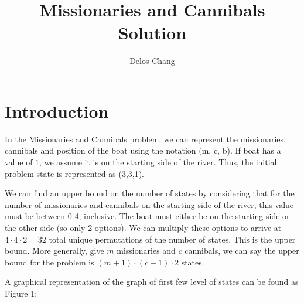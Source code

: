\documentclass[a4paper]{report}
\title{Missionaries and Cannibals Solution}
\author{Delos Chang}
\begin{document}
\maketitle

\section{Introduction}

In the Missionaries and Cannibals problem, we can represent the missionaries, cannibals and position of the boat 
using the notation (m, c, b). If boat has a value of $1$, we assume it is on the starting side of the river. Thus, 
the initial problem state is represented as (3,3,1). 

We can find an upper bound on the number of states by considering that for the number of missionaries and cannibals
on the starting side of the river, this value must be between 0-4, inclusive. The boat must either be on the starting
side or the other side (so only 2 options). We can multiply these options to arrive at $4 \cdot 4 \cdot 2 = 32$ total
unique permutations of the number of states. This is the upper bound. More generally, give $m$ missionaries and $c$
cannibals, we can say the upper bound for the problem is $(m+1) \cdot (c+1) \cdot 2$ states. 

A graphical representation of the graph of first few level of states can be found as Figure 1: 
\end{document}
